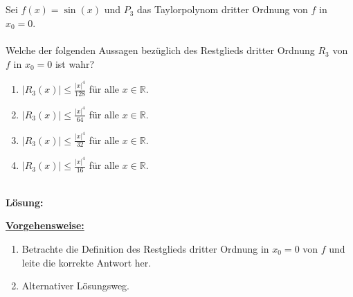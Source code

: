 \subsection*{}
Sei $ f(x) = \sin(x) $ und $ P_3  $ das Taylorpolynom  dritter Ordnung von $ f $ in $ x_0 = 0 $.\\
\\
Welche der folgenden Aussagen bezüglich des Restglieds dritter Ordnung $ R_3 $ von $ f  $ in $ x_0 = 0 $ ist wahr?
\renewcommand{\labelenumi}{(\alph{enumi})}
\begin{enumerate}
	\item 
	$ |R_3(x)| \leq \frac{|x|^4}{128} $ für alle $ x \in \mathbb{R} $.
	\item
	$ |R_3(x)| \leq \frac{|x|^4}{64} $ für alle $ x \in \mathbb{R} $.
	\item
	$ |R_3(x)| \leq \frac{|x|^4}{32} $ für alle $ x \in \mathbb{R} $.
	\item
	$ |R_3(x)| \leq \frac{|x|^4}{16} $ für alle $ x \in \mathbb{R} $.
\end{enumerate}
\ \\
\textbf{Lösung:}
\begin{mdframed}
\underline{\textbf{Vorgehensweise:}}
\renewcommand{\labelenumi}{\theenumi.}
\begin{enumerate}
\item Betrachte die Definition des Restglieds dritter Ordnung in $ x_0 = 0 $ von $ f $ und leite die korrekte Antwort her.
\item 
Alternativer Lösungsweg.
\end{enumerate}
\end{mdframed}

